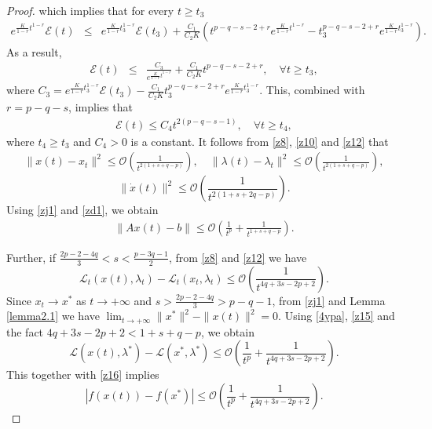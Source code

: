 \documentclass[review]{elsarticle}
\begin{document}
\begin{proof}
		which implies that for every $t\geq t_3$ 
		\begin{eqnarray*}
			e^{\frac{K}{1-r}t^{1-r}}\mathcal{E}(t)
			&\leq&e^{\frac{K}{1-r}t_{3}^{1-r}}\mathcal{E}(t_3)+
			\frac{C_1}{C_2K}\left(t^{p-q-s-2+r}e^{\frac{K}{1-r}t^{1-r}}-t_{3}^{p-q-s-2+r}e^{\frac{K}{1-r}t_{3}^{1-r}}\right).
		\end{eqnarray*}	
		As a result,
		\begin{eqnarray*}
			\mathcal{E}(t)
			&\leq&\frac{C_3}{e^{\frac{K}{1-r}t^{1-r}}}+
			\frac{C_1}{C_2K}t^{p-q-s-2+r}, \quad \forall t\geq t_3,
		\end{eqnarray*}	
		where $C_3=e^{\frac{K}{1-r}t_{3}^{1-r}}\mathcal{E}(t_3)-\frac{C_1}{C_2K}t_{3}^{p-q-s-2+r}e^{\frac{K}{1-r}t_{3}^{1-r}}$. This, combined with  $r=p-q-s$, implies that 
		\begin{eqnarray}\label{z12}
			\mathcal{E}(t)
			\leq C_4t^{2(p-q-s-1)}
			, \quad \forall t\geq t_4,
		\end{eqnarray}	
		where  $t_4\ge t_3$ and $C_4>0$ is a constant.
		It follows from \eqref{z8}, \eqref{z10} and \eqref{z12} that
		\begin{eqnarray}\label{zj1}
		\|x(t)-x_t\|^2\leq\mathcal{O}\left(\frac{1}{t^{2(1+s+q-p)}}\right), \quad \|\lambda(t)-\lambda_t\|^2\leq\mathcal{O}\left(\frac{1}{t^{2(1+s+q-p)}}\right),
    	\end{eqnarray}	
		$$\|\dot{x}(t)\|^2\leq\mathcal{O}\left(\frac{1}{t^{2(1+s+2q-p)}}\right).$$
		Using \eqref{zj1}  and \eqref{zd1}, we obtain 
		\begin{eqnarray*}\label{zdf1} 
			\|Ax(t)-b\|\leq\mathcal{O}\left(\frac{1}{t^{p}}+\frac{1}{t^{1+s+q-p}}\right).
		\end{eqnarray*}
	
		Further, if $\frac{2p-2-4q}{3}<s<\frac{p-3q-1}{2}$,  from \eqref{z8} and \eqref{z12} we have 
		\begin{equation}\label{4ypa}
\mathcal{L}_{t}(x(t),\lambda_t)-\mathcal{L}_{t}(x_t,\lambda_t)\leq\mathcal{O}\left(\frac{1}{t^{4q+3s-2p+2}}\right).
\end{equation}
		 Since $x_t\to x^*$ as $t\to +\infty$ and $s>\frac{2p-2-4q}{3}>p-q-1$, from \eqref{zj1} and Lemma \ref{lemma2.1} we have  $\lim_{t\rightarrow+\infty}\|x^*\|^2-\|x(t)\|^2=0$.
Using \eqref{4ypa}, \eqref{z15} and  the fact $4q+3s-2p+2<1+s+q-p$, we obtain
		$$\mathcal{L}(x(t),\lambda^*)-\mathcal{L}(x^*,\lambda^*)\leq\mathcal{O}\left(\frac{1}{t^{p}}+\frac{1}{t^{4q+3s-2p+2}}\right).$$ 
		This together with \eqref{z16} implies 
		$$|f(x(t))-f(x^*)|\leq\mathcal{O}\left(\frac{1}{t^{p}}+\frac{1}{t^{4q+3s-2p+2}}\right).$$
		

\end{proof}
\end{document}

